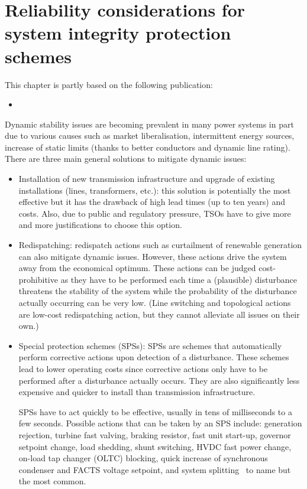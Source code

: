 \chapter{Reliability considerations for system integrity protection schemes}
\label{ch:SPS}
\minitoc

\begin{tcolorbox}[width=\linewidth, sharp corners=all,
    colback=white!80!black,
    colframe=white!80!black]
This chapter is partly based on the following publication:
\begin{itemize}
    \item {}
\end{itemize}
\end{tcolorbox}

Dynamic stability issues are becoming prevalent in many power systems in part due to various causes such as market liberalisation, intermittent energy sources, increase of static limits (thanks to better conductors and dynamic line rating). There are three main general solutions to mitigate dynamic issues:

\begin{itemize}
    \item Installation of new transmission infrastructure and upgrade of existing installations (lines, transformers, etc.): this solution is potentially the most effective but it has the drawback of high lead times (up to ten years) and costs. Also, due to public and regulatory pressure, TSOs have to give more and more justifications to choose this option.
    \item Redispatching: redispatch actions such as curtailment of renewable generation can also mitigate dynamic issues. However, these actions drive the system away from the economical optimum. These actions can be judged cost-prohibitive as they have to be performed each time a (plausible) disturbance threatens the stability of the system while the probability of the disturbance actually occurring can be very low. (Line switching and topological actions are low-cost redispatching action, but they cannot alleviate all issues on their own.)
    \item Special protection schemes (SPSs): SPSs are schemes that automatically perform corrective actions upon detection of a disturbance. These schemes lead to lower operating costs since corrective actions only have to be performed after a disturbance actually occurs. They are also significantly less expensive and quicker to install than transmission infrastructure.

    SPSs have to act quickly to be effective, usually in tens of milliseconds to a few seconds. Possible actions that can be taken by an SPS include: generation rejection, turbine fast valving, braking resistor, fast unit start-up, governor setpoint change, load shedding, shunt switching, HVDC fast power change, on-load tap changer (OLTC) blocking, quick increase of synchronous condenser and FACTS voltage setpoint, and system splitting~\cite{CigreDefensePlan} to name but the most common.
\end{itemize}


